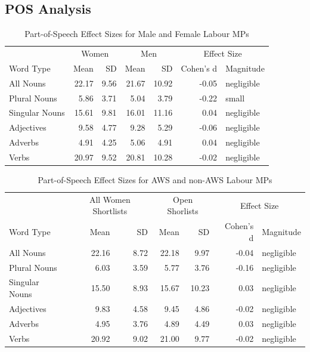 \documentclass[]{article}
\theoremstyle{definition}
\theoremstyle{definition}
\theoremstyle{definition}
\theoremstyle{remark}
\begin{document}
\hypertarget{pos-analysis}{%
\subsection{POS Analysis}\label{pos-analysis}}

\begin{table}[H]

\caption{\label{tab:pos-gender-table}Part-of-Speech Effect Sizes for Male and Female Labour MPs}
\centering
\begin{tabular}[t]{lrrrrrl}
\toprule
\multicolumn{1}{c}{ } & \multicolumn{2}{c}{Women} & \multicolumn{2}{c}{Men} & \multicolumn{2}{c}{Effect Size} \\
\cmidrule(l{2pt}r{2pt}){2-3} \cmidrule(l{2pt}r{2pt}){4-5} \cmidrule(l{2pt}r{2pt}){6-7}
Word Type & Mean & SD & Mean & SD & Cohen's d & Magnitude\\
\midrule
All Nouns & 22.17 & 9.56 & 21.67 & 10.92 & -0.05 & negligible\\
\hspace{1em}Plural Nouns & 5.86 & 3.71 & 5.04 & 3.79 & -0.22 & small\\
\hspace{1em}Singular Nouns & 15.61 & 9.81 & 16.01 & 11.16 & 0.04 & negligible\\
Adjectives & 9.58 & 4.77 & 9.28 & 5.29 & -0.06 & negligible\\
Adverbs & 4.91 & 4.25 & 5.06 & 4.91 & 0.04 & negligible\\
Verbs & 20.97 & 9.52 & 20.81 & 10.28 & -0.02 & negligible\\
\bottomrule
\end{tabular}
\end{table}

\begin{table}[H]

\caption{\label{tab:pos-sl-table}Part-of-Speech Effect Sizes for AWS and non-AWS Labour MPs}
\centering
\begin{tabular}[t]{lrrrrrl}
\toprule
\multicolumn{1}{c}{ } & \multicolumn{2}{c}{All Women Shortlists} & \multicolumn{2}{c}{Open Shorlists} & \multicolumn{2}{c}{Effect Size} \\
\cmidrule(l{2pt}r{2pt}){2-3} \cmidrule(l{2pt}r{2pt}){4-5} \cmidrule(l{2pt}r{2pt}){6-7}
Word Type & Mean & SD & Mean & SD & Cohen's d & Magnitude\\
\midrule
All Nouns & 22.16 & 8.72 & 22.18 & 9.97 & -0.04 & negligible\\
\hspace{1em}Plural Nouns & 6.03 & 3.59 & 5.77 & 3.76 & -0.16 & negligible\\
\hspace{1em}Singular Nouns & 15.50 & 8.93 & 15.67 & 10.23 & 0.03 & negligible\\
Adjectives & 9.83 & 4.58 & 9.45 & 4.86 & -0.02 & negligible\\
Adverbs & 4.95 & 3.76 & 4.89 & 4.49 & 0.03 & negligible\\
Verbs & 20.92 & 9.02 & 21.00 & 9.77 & -0.02 & negligible\\
\bottomrule
\end{tabular}
\end{table}
\end{document}
